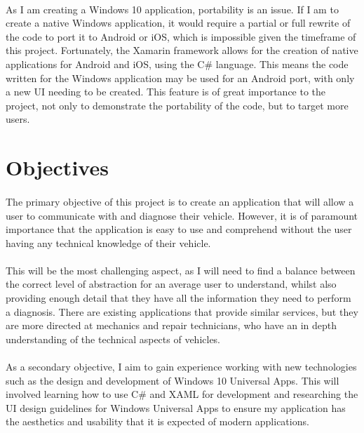 	\paragraph{}{
	As I am creating a Windows 10 application, portability is an issue. If I am to create a native Windows application, it would require a partial or full rewrite of the code to port it to Android or iOS, which is impossible given the timeframe of this project. Fortunately, the Xamarin framework allows for the creation of native applications for Android and iOS, using the C{\#} language. This means the code written for the Windows application may be used for an Android port, with only a new UI needing to be created. This feature is of great importance to the project, not only to demonstrate the portability of the code, but to target more users.
	}
	\newpage
	
\section{Objectives}
	\paragraph{}{
	The primary objective of this project is to create an application that will allow a user to communicate with and diagnose their vehicle. However, it is of paramount importance that the application is easy to use and comprehend without the user having any technical knowledge of their vehicle.  
	}
	\paragraph{}{
	This will be the most challenging aspect, as I will need to find a balance between the correct level of abstraction for an average user to understand, whilst also providing enough detail that they have all the information they need to perform a diagnosis. There are existing applications that provide similar services, but they are more directed at mechanics and repair technicians, who have an in depth understanding of the technical aspects of vehicles.
	}
	\paragraph{}{
	As a secondary objective, I aim to gain experience working with new technologies such as the design and development of Windows 10 Universal Apps. This will involved learning how to use C{\#} and XAML for development and researching the UI design guidelines for Windows Universal Apps to ensure my application has the aesthetics and usability that it is expected of modern applications.
	}
	

